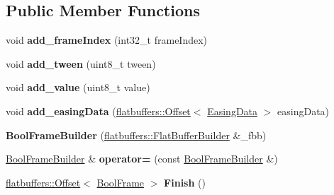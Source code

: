 \subsection*{Public Member Functions}
\begin{DoxyCompactItemize}
\item 
\mbox{\label{structflatbuffers_1_1BoolFrameBuilder_a22b139f36a12295c35d4dd50854fa02b}} 
void {\bfseries add\+\_\+frame\+Index} (int32\+\_\+t frame\+Index)
\item 
\mbox{\label{structflatbuffers_1_1BoolFrameBuilder_a864b9359bd51d01bd701d3e22f1c4815}} 
void {\bfseries add\+\_\+tween} (uint8\+\_\+t tween)
\item 
\mbox{\label{structflatbuffers_1_1BoolFrameBuilder_af93c40f42bdeb8f4c27c6d5e7066d585}} 
void {\bfseries add\+\_\+value} (uint8\+\_\+t value)
\item 
\mbox{\label{structflatbuffers_1_1BoolFrameBuilder_ae28e29be50b9339aa748809b40eef13f}} 
void {\bfseries add\+\_\+easing\+Data} (\hyperlink{structflatbuffers_1_1Offset}{flatbuffers\+::\+Offset}$<$ \hyperlink{structflatbuffers_1_1EasingData}{Easing\+Data} $>$ easing\+Data)
\item 
\mbox{\label{structflatbuffers_1_1BoolFrameBuilder_ae0be7b132b7ad8677028950332d9582f}} 
{\bfseries Bool\+Frame\+Builder} (\hyperlink{classflatbuffers_1_1FlatBufferBuilder}{flatbuffers\+::\+Flat\+Buffer\+Builder} \&\+\_\+fbb)
\item 
\mbox{\label{structflatbuffers_1_1BoolFrameBuilder_a895ed5468fbd79fecfa88371349294f8}} 
\hyperlink{structflatbuffers_1_1BoolFrameBuilder}{Bool\+Frame\+Builder} \& {\bfseries operator=} (const \hyperlink{structflatbuffers_1_1BoolFrameBuilder}{Bool\+Frame\+Builder} \&)
\item 
\mbox{\label{structflatbuffers_1_1BoolFrameBuilder_a2a0f643b0fffd7baefbffcbfe484492c}} 
\hyperlink{structflatbuffers_1_1Offset}{flatbuffers\+::\+Offset}$<$ \hyperlink{structflatbuffers_1_1BoolFrame}{Bool\+Frame} $>$ {\bfseries Finish} ()

\end{DoxyCompactItemize}
